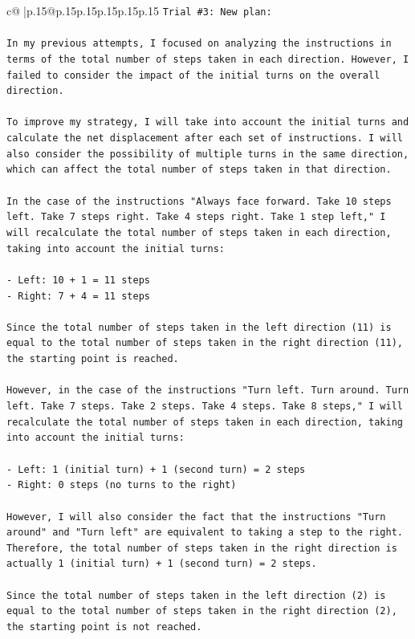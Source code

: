 \documentclass{article}
\begin{document}
{\begin{supertabular}{c@{$\;$}|p{.15\linewidth}@{}p{.15\linewidth}p{.15\linewidth}p{.15\linewidth}p{.15\linewidth}p{.15\linewidth}}
{{{\texttt{Trial \#3: New plan: } \\
\\ 
\texttt{In my previous attempts, I focused on analyzing the instructions in terms of the total number of steps taken in each direction. However, I failed to consider the impact of the initial turns on the overall direction. } \\
\\ 
\texttt{To improve my strategy, I will take into account the initial turns and calculate the net displacement after each set of instructions. I will also consider the possibility of multiple turns in the same direction, which can affect the total number of steps taken in that direction.} \\
\\ 
\texttt{In the case of the instructions "Always face forward. Take 10 steps left. Take 7 steps right. Take 4 steps right. Take 1 step left," I will recalculate the total number of steps taken in each direction, taking into account the initial turns:} \\
\\ 
\texttt{{-} Left: 10 + 1 = 11 steps} \\
\texttt{{-} Right: 7 + 4 = 11 steps} \\
\\ 
\texttt{Since the total number of steps taken in the left direction (11) is equal to the total number of steps taken in the right direction (11), the starting point is reached.} \\
\\ 
\texttt{However, in the case of the instructions "Turn left. Turn around. Turn left. Take 7 steps. Take 2 steps. Take 4 steps. Take 8 steps," I will recalculate the total number of steps taken in each direction, taking into account the initial turns:} \\
\\ 
\texttt{{-} Left: 1 (initial turn) + 1 (second turn) = 2 steps} \\
\texttt{{-} Right: 0 steps (no turns to the right)} \\
\\ 
\texttt{However, I will also consider the fact that the instructions "Turn around" and "Turn left" are equivalent to taking a step to the right. Therefore, the total number of steps taken in the right direction is actually 1 (initial turn) + 1 (second turn) = 2 steps.} \\
\\ 
\texttt{Since the total number of steps taken in the left direction (2) is equal to the total number of steps taken in the right direction (2), the starting point is not reached.} \\
}}}
\end{supertabular}}
\end{document}
